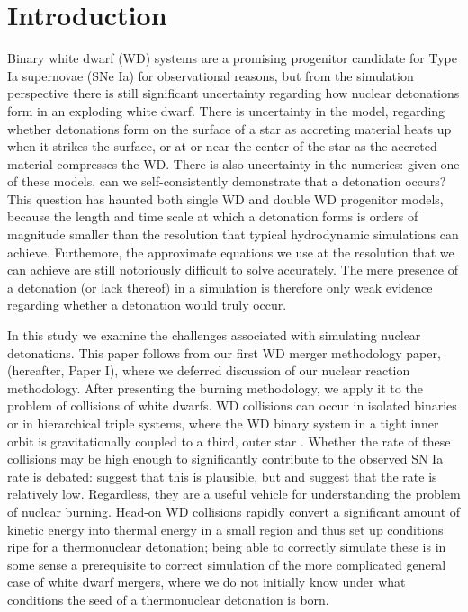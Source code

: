 \documentclass[twocolumn,numberedappendix]{../aastex6}
\begin{document}
\section{Introduction}
\label{sec:introduction}

Binary white dwarf (WD) systems are a promising progenitor candidate for Type
Ia supernovae (SNe Ia) for observational reasons, but from the simulation
perspective there is still significant uncertainty regarding how nuclear
detonations form in an exploding white dwarf. There is uncertainty in the
model, regarding whether detonations form on the surface of a star as
accreting material heats up when it strikes the surface, or at or near the
center of the star as the accreted material compresses the WD. There is also
uncertainty in the numerics: given one of these models, can we self-consistently
demonstrate that a detonation occurs? This question has haunted both single
WD and double WD progenitor models, because the length and time scale at which
a detonation forms is orders of magnitude smaller than the resolution that
typical hydrodynamic simulations can achieve. Furthemore, the approximate equations
we use at the resolution that we can achieve are still notoriously
difficult to solve accurately. The mere presence of a detonation
(or lack thereof) in a simulation is therefore only weak evidence regarding
whether a detonation would truly occur.

In this study we examine the challenges associated with simulating nuclear detonations.
This paper follows from our first WD merger methodology paper, \citet{wdmergerI}
(hereafter, Paper I), where we deferred discussion of our nuclear reaction methodology.
After presenting the burning methodology, we apply it to the problem of collisions of white dwarfs.
WD collisions can occur in isolated binaries or in hierarchical triple systems, where the WD binary
system in a tight inner orbit is gravitationally coupled to a third, outer star \citep{thompson:2011,hamers:2013}.
Whether the rate of these collisions may be high enough to significantly contribute to
the observed SN Ia rate is debated: \cite{katzdong:2012} suggest that this is plausible,
but \cite{hamers:2013} and \cite{papish:2015} suggest that the rate is relatively low.
Regardless, they are a useful vehicle for understanding the problem of nuclear burning.
Head-on WD collisions rapidly convert a significant amount of kinetic energy into thermal
energy in a small region and thus set up conditions ripe for a thermonuclear detonation;
being able to correctly simulate these is in some sense a prerequisite to correct simulation
of the more complicated general case of white dwarf mergers, where we do not initially know
under what conditions the seed of a thermonuclear detonation is born.
\end{document}
